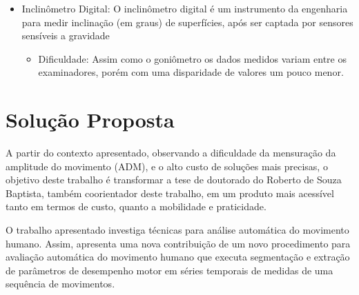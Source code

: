 \begin{itemize}
\item Inclinômetro Digital: O inclinômetro digital é um instrumento da 
engenharia para medir inclinação (em graus) de superfícies, após ser captada 
por sensores sensíveis a gravidade\cite{erroMedicao2012}
  \begin{itemize}
  \item Dificuldade: Assim como o goniômetro os dados medidos variam entre os 
  examinadores, porém com uma disparidade de valores um pouco menor.
  \end{itemize}

\end{itemize}
                                                                                  
\section{Solução Proposta}                                                      
\label{Sec:SolucaoProposta}
  
  A partir do contexto apresentado, observando a dificuldade da mensuração da 
amplitude do movimento (ADM), e o alto custo de soluções mais precisas, o 
objetivo deste trabalho é transformar a tese de doutorado do Roberto de Souza 
Baptista, também coorientador deste trabalho, em um produto mais acessível 
tanto em termos de custo, quanto a mobilidade e praticidade.
                                                            
  O trabalho apresentado investiga técnicas para análise automática do
movimento humano. Assim, apresenta uma nova contribuição de um novo 
procedimento para avaliação automática do movimento humano que executa 
segmentação e extração de parâmetros de desempenho motor em séries temporais 
de medidas de uma sequência de movimentos.
  
